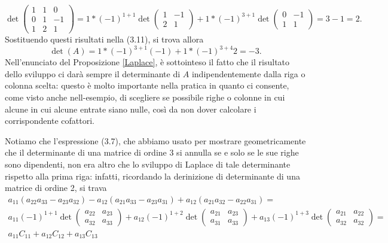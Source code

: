 \begin{esempio}
\begin{equation*}
    \det\begin{pmatrix} 1 & 1 & 0 \\ 0 & 1 & -1 \\ 1 & 2 & 1\end{pmatrix}=1*(-1)^{1+1}\det\begin{pmatrix} 1 & -1 \\ 2 & 1 \end{pmatrix} + 1 * (-1)^{3+1}\det\begin{pmatrix} 0 & -1 \\ 1 & 1\end{pmatrix} =3-1=2.
  \end{equation*}
  Sostituendo questi risultati nella (3.11), si trova allora
  \begin{equation*}
    \det(A)=1*(-1)^{3+1}(-1)+1*(-1)^{3+4}2=-3.
  \end{equation*}
  Nell'enunciato del Proposizione \ref{Laplace}, è sottointeso il fatto che il risultato dello sviluppo ci darà sempre il determinante di $A$ indipendentemente dalla riga o colonna scelta: questo è molto importante nella pratica in quanto ci consente, come visto anche nell-esempio, di scegliere se possibile righe o colonne in cui alcune in cui alcune entrate siano nulle, così da non dover calcolare i corrispondente cofattori. 
\end{esempio}
\begin{osservazione}
  Notiamo che l'espressione (3.7), che abbiamo usato per mostrare geometricamente che il determinante di una matrice di ordine 3 si annulla se e solo se le sue righe sono dipendenti, non era altro che lo sviluppo di Laplace di tale determinante rispetto alla prima riga: infatti, ricordando la derinizione di determinante di una matrice di ordine 2, si trava
  \begin{equation*}
	\begin{matrix}
          a_{11}(a_{22}a_{33}-a_{23}a_{32})-a_{12}(a_{21}a_{33}-a_{23}a_{31})+a_{12}(a_{21}a_{32}-a_{22}a_{31})=\\
          a_{11}(-1)^{1+1}\det\begin{pmatrix} a_{22} & a_{23} \\ a_{32} & a_{33}\end{pmatrix}+a_{12}(-1)^{1+2}\det\begin{pmatrix} a_{21} & a_{23} \\ a_{31} & a_{33}\end{pmatrix}+a_{13}(-1)^{1+3}\det\begin{pmatrix} a_{21} & a_{22} \\ a_{32} & a_{32}\end{pmatrix}=\\a_{11}C_{11}+a_{12}C_{12}+a_{13}C_{13}
        \end{matrix}
  \end{equation*} 
\end{osservazione}
